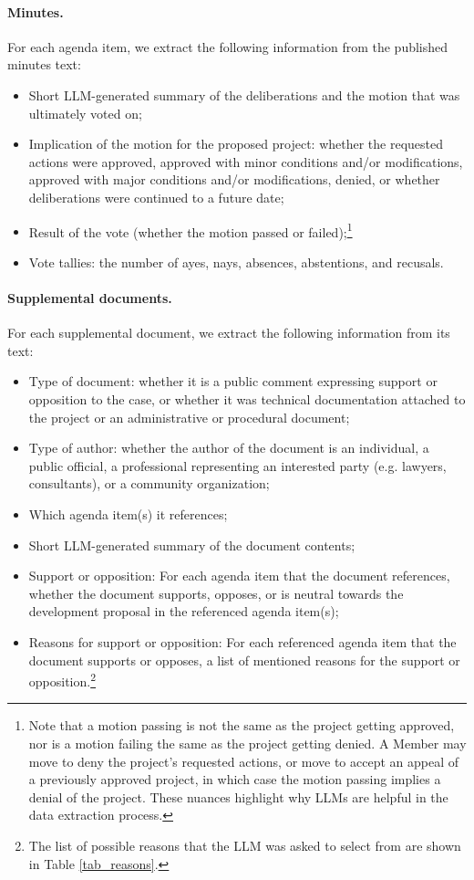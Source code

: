\paragraph{Minutes.} For each agenda item, we extract the following information from the published minutes text:
\begin{itemize}[noitemsep, topsep=0pt]
\item Short LLM-generated summary of the deliberations and the motion that was ultimately voted on;
\item Implication of the motion for the proposed project: whether the requested actions were approved, approved with minor conditions and/or modifications, approved with major conditions and/or modifications, denied, or whether deliberations were continued to a future date;
\item Result of the vote (whether the motion passed or failed);\footnote{Note that a motion passing is not the same as the project getting approved, nor is a motion failing the same as the project getting denied. A Member may move to deny the project's requested actions, or move to accept an appeal of a previously approved project, in which case the motion passing implies a denial of the project. These nuances highlight why LLMs are helpful in the data extraction process.}
\item Vote tallies: the number of ayes, nays, absences, abstentions, and recusals.
\end{itemize}

\paragraph{Supplemental documents.} For each supplemental document, we extract the following information from its text:
\begin{itemize}[noitemsep, topsep=0pt]
\item Type of document: whether it is a public comment expressing support or opposition to the case, or whether it was technical documentation attached to the project or an administrative or procedural document;
\item Type of author: whether the author of the document is an individual, a public official, a professional representing an interested party (e.g. lawyers, consultants), or a community organization;
\item Which agenda item(s) it references;
\item Short LLM-generated summary of the document contents;
\item Support or opposition: For each agenda item that the document references, whether the document supports, opposes, or is neutral towards the development proposal in the referenced agenda item(s);
\item Reasons for support or opposition: For each referenced agenda item that the document supports or opposes, a list of mentioned reasons for the support or opposition.\footnote{The list of possible reasons that the LLM was asked to select from are shown in Table \ref{tab_reasons}.}
\end{itemize}

